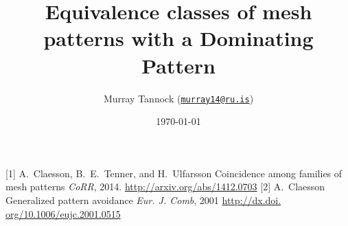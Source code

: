 \documentclass[11pt, aspectratio=32]{beamer}
\title[Dominating Patterns]{Equivalence classes of mesh patterns with a Dominating Pattern}
\author[M.~Tannock]{Murray Tannock (\href{mailto:murray14@ru.is}{\texttt{murray14@ru.is}})}
\institute[Reykjavik University]
{
\texttt{[image: rulogo]}
}
\date{\today}
\begin{document}
  \begin{frame}
    \titlepage
  \end{frame}





\begin{thebibliography}{10}
  [1]
    A.~Claesson, B.~E.~Tenner, and H.~Ulfarsson
    \newblock Coincidence among families of mesh patterns
    \newblock \emph{CoRR}, 2014.
    \url{http://arxiv.org/abs/1412.0703}
  [2]
   A.~Claesson
   \newblock Generalized pattern avoidance
   \newblock \emph{Eur. J. Comb}, 2001
   \url{http://dx.doi. org/10.1006/eujc.2001.0515}
  \end{thebibliography}
\end{document}
